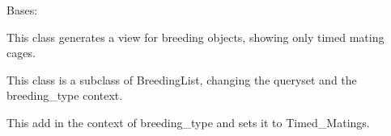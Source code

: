 \documentclass[letterpaper,10pt,english]{sphinxmanual}
\begin{document}

\begin{fulllineitems}
\label{api:mousedb.animal.views.BreedingListTimedMating}
Bases: {\hyperref[api:mousedb.animal.views.BreedingList]{}}

This class generates a view for breeding objects, showing only timed mating cages.

This class is a subclass of BreedingList, changing the queryset and the  breeding\_type context.


\begin{fulllineitems}
\label{api:mousedb.animal.views.BreedingListTimedMating.get_context_data}
This add in the context of breeding\_type and sets it to Timed\_Matings.

\end{fulllineitems}


\end{fulllineitems}


\end{document}
